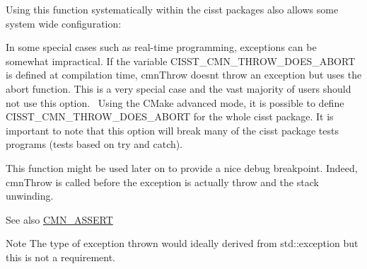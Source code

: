 Using this function systematically within the cisst packages also allows some system wide configuration\+:

\begin{DoxyItemize}
\item In some special cases such as real-\/time programming, exceptions can be somewhat impractical. If the variable {\ttfamily C\+I\+S\+S\+T\+\_\+\+C\+M\+N\+\_\+\+T\+H\+R\+O\+W\+\_\+\+D\+O\+E\+S\+\_\+\+A\+B\+O\+R\+T} is defined at compilation time, cmn\+Throw doesn\textquotesingle{}t throw an exception but uses the {\ttfamily abort} function. This is a very special case and the vast majority of users should not use this option.~\newline
Using the C\+Make advanced mode, it is possible to define C\+I\+S\+S\+T\+\_\+\+C\+M\+N\+\_\+\+T\+H\+R\+O\+W\+\_\+\+D\+O\+E\+S\+\_\+\+A\+B\+O\+R\+T for the whole cisst package. It is important to note that this option will break many of the cisst package tests programs (tests based on {\ttfamily try} and {\ttfamily catch}).\end{DoxyItemize}
\begin{DoxyItemize}
\item This function might be used later on to provide a nice debug breakpoint. Indeed, cmn\+Throw is called before the exception is actually throw and the stack unwinding.\end{DoxyItemize}
\begin{DoxySeeAlso}{See also}
\hyperlink{group__cisst_common_ga6a12b7031ea38ac5bf5937b8633c97ff}{C\+M\+N\+\_\+\+A\+S\+S\+E\+R\+T}
\end{DoxySeeAlso}
\begin{DoxyNote}{Note}
The type of exception thrown would ideally derived from {\ttfamily std\+::exception} but this is not a requirement. 
\end{DoxyNote}

